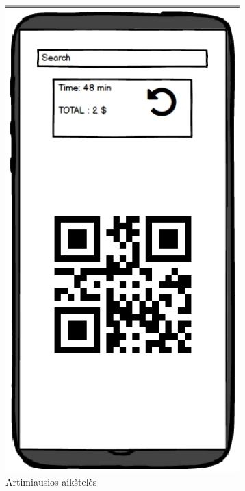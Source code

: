 \documentclass{VUMIFPSkursinis}
\begin{document}
\begin{figure}[H]
    \centering
    \includegraphics[scale=0.5]{img/vyt3}
	\caption{Artimiausios aikštelės \label{fig:vyt3}}
\end{figure}
\end{document}
